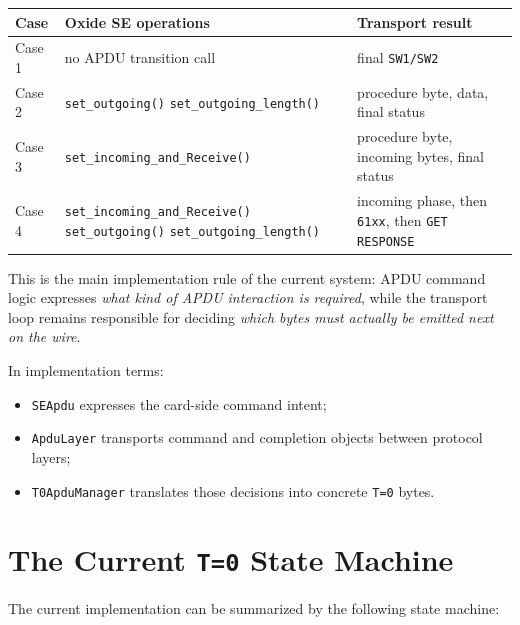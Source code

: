 \begin{center}
\begin{tabular}{|p{2.1cm}|p{6.0cm}|p{6.0cm}|}
\hline
\textbf{Case} & \textbf{Oxide SE operations} & \textbf{Transport result} \\
\hline
Case 1 & no APDU transition call & final \texttt{SW1/SW2} \\
\hline
Case 2 & \texttt{set\_outgoing()}\newline
         \texttt{set\_outgoing\_length()} &
         procedure byte, data, final status \\
\hline
Case 3 & \texttt{set\_incoming\_and\_Receive()} &
         procedure byte, incoming bytes, final status \\
\hline
Case 4 & \texttt{set\_incoming\_and\_Receive()}\newline
         \texttt{set\_outgoing()}\newline
         \texttt{set\_outgoing\_length()} &
         incoming phase, then \texttt{61xx}, then \texttt{GET RESPONSE} \\
\hline
\end{tabular}
\end{center}

This is the main implementation rule of the current system: APDU command
logic expresses \emph{what kind of APDU interaction is required}, while
the transport loop remains responsible for deciding \emph{which bytes
must actually be emitted next on the wire}.

In implementation terms:
\begin{itemize}
\item \texttt{SEApdu} expresses the card-side command intent;
\item \texttt{ApduLayer} transports command and completion objects
  between protocol layers;
\item \texttt{T0ApduManager} translates those decisions into concrete
  \texttt{T=0} bytes.
\end{itemize}

\section{The Current \texttt{T=0} State Machine}

The current implementation can be summarized by the following state
machine:

